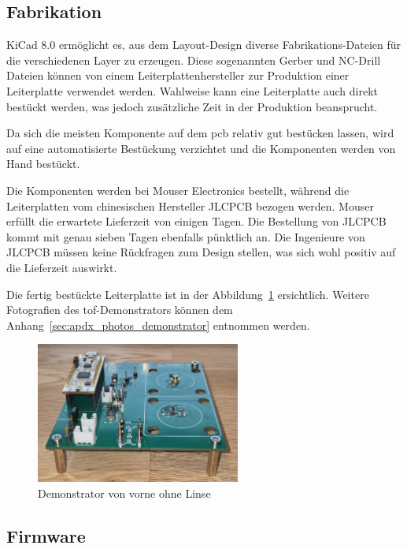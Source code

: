 \subsection{Fabrikation}
KiCad 8.0 ermöglicht es, aus dem Layout-Design diverse Fabrikations-Dateien für die verschiedenen Layer zu erzeugen.
Diese sogenannten Gerber und NC-Drill Dateien können von einem Leiterplattenhersteller zur Produktion einer Leiterplatte
verwendet werden. Wahlweise kann eine Leiterplatte auch direkt bestückt werden, was jedoch zusätzliche Zeit in der
Produktion beansprucht.

Da sich die meisten Komponente auf dem \acrshort{pcb} relativ gut bestücken lassen, wird auf eine automatisierte Bestückung
verzichtet und die Komponenten werden von Hand bestückt.

Die Komponenten werden bei Mouser Electronics bestellt, während die Leiterplatten vom chinesischen Hersteller JLCPCB
\cite{jlc2025jlcpcb} bezogen werden. Mouser erfüllt die erwartete Lieferzeit von einigen Tagen. Die Bestellung von
JLCPCB kommt mit genau sieben Tagen ebenfalls pünktlich an. Die Ingenieure von JLCPCB müssen keine Rückfragen zum Design
stellen, was sich wohl positiv auf die Lieferzeit auswirkt.

Die fertig bestückte Leiterplatte ist in der Abbildung~\ref{fig:photo_demonstrator_front_wo_lens} ersichtlich. Weitere
Fotografien des \acrshort{tof}-Demonstrators können dem Anhang~\ref{sec:apdx_photos_demonstrator} entnommen werden.

\begin{figure}[H]
    \centering
    \includegraphics[width=0.6\textwidth]{graphics/photo_demonstrator_front_wo_lens.jpg}
    \caption{Demonstrator von vorne ohne Linse}\label{fig:photo_demonstrator_front_wo_lens}
\end{figure}

\subsection{Firmware}

